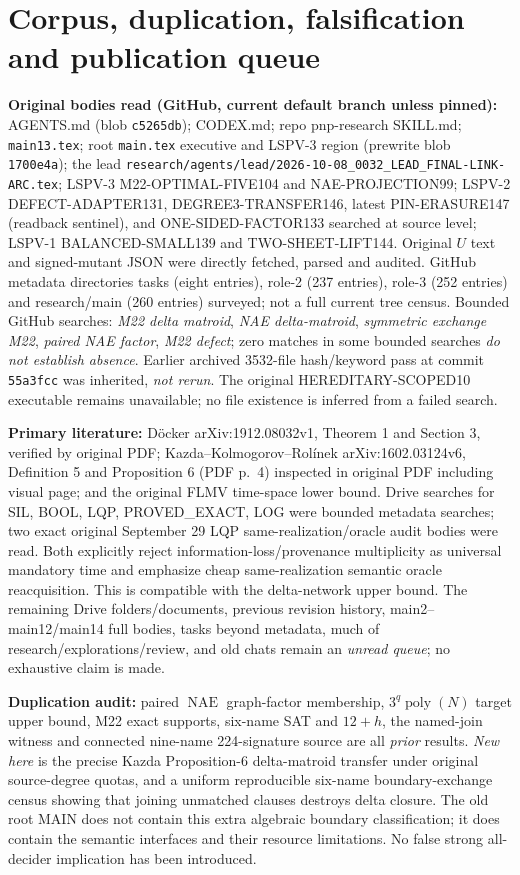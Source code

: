\documentclass[11pt]{article}
\newcommand{\NAE}{\operatorname{NAE}}
\begin{document}
\section{Corpus, duplication, falsification and publication queue}
\textbf{Original bodies read (GitHub, current default branch unless pinned):} AGENTS.md (blob \texttt{c5265db}); CODEX.md; repo pnp-research SKILL.md; \texttt{main13.tex}; root \texttt{main.tex} executive and LSPV-3 region (prewrite blob \texttt{1700e4a}); the lead \texttt{research/agents/lead/2026-10-08\_0032\_LEAD\_FINAL-LINK-ARC.tex}; LSPV-3 M22-OPTIMAL-FIVE104 and NAE-PROJECTION99; LSPV-2 DEFECT-ADAPTER131, DEGREE3-TRANSFER146, latest PIN-ERASURE147 (readback sentinel), and ONE-SIDED-FACTOR133 searched at source level; LSPV-1 BALANCED-SMALL139 and TWO-SHEET-LIFT144. Original $U$ text and signed-mutant JSON were directly fetched, parsed and audited. GitHub metadata directories tasks (eight entries), role-2 (237 entries), role-3 (252 entries) and research/main (260 entries) surveyed; not a full current tree census. Bounded GitHub searches: \emph{M22 delta matroid}, \emph{NAE delta-matroid}, \emph{symmetric exchange M22}, \emph{paired NAE factor}, \emph{M22 defect}; zero matches in some bounded searches \emph{do not establish absence}. Earlier archived 3532-file hash/keyword pass at commit \texttt{55a3fcc} was inherited, \emph{not rerun}. The original HEREDITARY-SCOPED10 executable remains unavailable; no file existence is inferred from a failed search.

\textbf{Primary literature:} D\"ocker arXiv:1912.08032v1, Theorem 1 and Section 3, verified by original PDF; Kazda--Kolmogorov--Rol\'inek arXiv:1602.03124v6, Definition 5 and Proposition 6 (PDF p.~4) inspected in original PDF including visual page; and the original FLMV time-space lower bound. Drive searches for SIL, BOOL, LQP, PROVED\_EXACT, LOG were bounded metadata searches; two exact original September 29 LQP same-realization/oracle audit bodies were read. Both explicitly reject information-loss/provenance multiplicity as universal mandatory time and emphasize cheap same-realization semantic oracle reacquisition. This is compatible with the delta-network upper bound. The remaining Drive folders/documents, previous revision history, main2--main12/main14 full bodies, tasks beyond metadata, much of research/explorations/review, and old chats remain an \emph{unread queue}; no exhaustive claim is made.

\textbf{Duplication audit:} paired $\NAE$ graph-factor membership, $3^q\operatorname{poly}(N)$ target upper bound, M22 exact supports, six-name SAT and $12+h$, the named-join witness and connected nine-name 224-signature source are all \emph{prior} results. \emph{New here} is the precise Kazda Proposition-6 delta-matroid transfer under original source-degree quotas, and a uniform reproducible six-name boundary-exchange census showing that joining unmatched clauses destroys delta closure. The old root MAIN does not contain this extra algebraic boundary classification; it does contain the semantic interfaces and their resource limitations. No false strong all-decider implication has been introduced.
\end{document}
